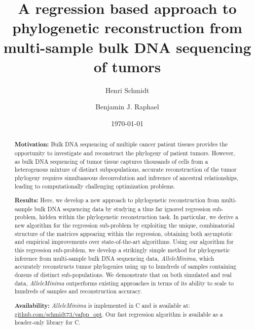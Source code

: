 \documentclass[10pt]{article}
\title{
    A regression based approach to phylogenetic reconstruction 
    from multi-sample bulk DNA sequencing of tumors
}
\author[1]{Henri Schmidt}
\author[1,$\dagger$]{Benjamin J. Raphael}
\affil[1]{Department of Computer Science, Princeton University, NJ, USA}
\affil[$\dagger$]{Correspondence: braphael@princeton.edu}
\date{\today}
\newcommand{\ourmethod}{\textit{AlleleMinima}\xspace}
\newcommand{\Rplus}{\protect\hspace{-.1em}\protect\raisebox{.35ex}{\smaller{\smaller\textbf{+}}}}
\newcommand{\Cpp}{\mbox{C\Rplus\Rplus}\xspace}
\begin{document}
\maketitle

\begin{abstract}
    \textbf{Motivation:} Bulk DNA sequencing of multiple cancer patient tissues provides the opportunity to 
    investigate and reconstruct the phylogeny of patient tumors. However, as 
    bulk DNA sequencing of tumor tissue captures thousands of cells from a heterogenous 
    mixture of distinct subpopulations, accurate reconstruction of the tumor phylogeny
    requires simultaneous deconvolution and inference of ancestral relationships, leading
    to computationally challenging optimization problems. 

    \textbf{Results:} Here, we develop a new
    approach to phylogenetic reconstruction from multi-sample bulk DNA sequencing data by 
    studying a thus far ignored regression sub-problem, hidden within the phylogenetic
    reconstruction task. In particular, we derive a new algorithm for the 
    regression sub-problem by exploiting the unique, combinatorial structure of the matrices
    appearing within the regression, obtaining both asymptotic and empirical improvements
    over state-of-the-art algorithms. Using our algorithm for this regression sub-problem,
    we develop a strikingly simple method for phylogenetic inference from multi-sample bulk 
    DNA sequencing data, \ourmethod, which accurately reconstructs tumor phylogenies 
    using up to hundreds of samples containing dozens of distinct sub-populations. We
    demonstrate that on both simulated and real data, \ourmethod outperforms existing approaches
    in terms of its ability to scale to hundreds of samples and reconstruction accuracy.

    \textbf{Availability:} \ourmethod is implemented in \Cpp and is available at: \url{github.com/schmidt73/vafpp_opt}. 
    Our fast regression algorithm is available as a header-only library for \Cpp.
\end{abstract}
\end{document}
